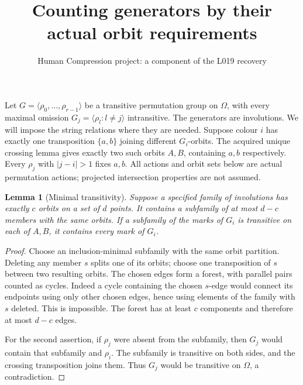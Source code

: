\documentclass[11pt,a4paper]{article}
\title{Counting generators by their actual orbit requirements}
\author{Human Compression project: a component of the L019 recovery}
\date{}
\newtheorem{lemma}{Lemma}
\newcommand{\gen}[1]{\langle#1\rangle}
\begin{document}
\maketitle
Let $G=\gen{\rho_0,\ldots,\rho_{r-1}}$ be a transitive
permutation group on $\Omega$, with every maximal omission
$G_j=\gen{\rho_l:l\ne j}$ intransitive. The generators are
involutions. We will impose the string relations where they
are needed. Suppose colour $i$ has exactly one transposition
$\{a,b\}$ joining different $G_i$-orbits. The acquired unique
crossing lemma gives exactly two such orbits $A,B$, containing
$a,b$ respectively. Every $\rho_j$ with $|j-i|>1$ fixes
$a,b$. All actions and orbit sets below are actual permutation
actions; projected intersection properties are not assumed.

\begin{lemma}[Minimal transitivity]\label{minimal}
Suppose a specified family of involutions has exactly $c$
orbits on a set of $d$ points. It contains a subfamily of at
most $d-c$ members with the same orbits. If a subfamily of the
marks of $G_i$ is transitive on each of $A,B$, it contains
every mark of $G_i$.
\end{lemma}
\begin{proof}
Choose an inclusion-minimal subfamily with the same orbit
partition. Deleting any member $s$ splits one of its orbits;
choose one transposition of $s$ between two resulting orbits.
The chosen edges form a forest, with parallel pairs counted
as cycles. Indeed a cycle containing
the chosen $s$-edge would connect its endpoints using only
other chosen edges, hence using elements of the family with
$s$ deleted. This is impossible. The forest has at least
$c$ components and therefore at most $d-c$ edges.

For the second assertion, if $\rho_j$ were absent from the
subfamily, then $G_j$ would contain that subfamily and
$\rho_i$. The subfamily is transitive on both sides, and
the crossing transposition joins them. Thus $G_j$ would be
transitive on $\Omega$, a contradiction.
\end{proof}
\end{document}
